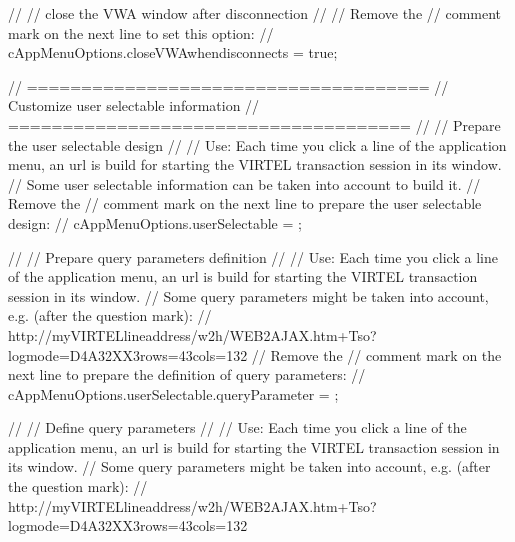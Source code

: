\documentclass[letterpaper,10pt,english]{sphinxmanual}
\begin{document}
\begin{sphinxVerbatim}[commandchars=\\\{\}]
//
// close the VWA window after disconnection
// \PYGZhy{}\PYGZhy{}\PYGZhy{}\PYGZhy{}\PYGZhy{}\PYGZhy{}\PYGZhy{}\PYGZhy{}\PYGZhy{}\PYGZhy{}\PYGZhy{}\PYGZhy{}\PYGZhy{}\PYGZhy{}\PYGZhy{}\PYGZhy{}\PYGZhy{}\PYGZhy{}\PYGZhy{}\PYGZhy{}\PYGZhy{}\PYGZhy{}\PYGZhy{}\PYGZhy{}\PYGZhy{}\PYGZhy{}\PYGZhy{}\PYGZhy{}\PYGZhy{}\PYGZhy{}\PYGZhy{}\PYGZhy{}\PYGZhy{}\PYGZhy{}\PYGZhy{}\PYGZhy{}\PYGZhy{}\PYGZhy{}\PYGZhy{}\PYGZhy{}
// Remove the // comment mark on the next line to set this option:
// cAppMenuOptions.close\PYGZus{}VWA\PYGZus{}when\PYGZus{}disconnects = true;






// =====================================
// Customize user selectable information
// =====================================
//
// Prepare the user selectable design
// \PYGZhy{}\PYGZhy{}\PYGZhy{}\PYGZhy{}\PYGZhy{}\PYGZhy{}\PYGZhy{}\PYGZhy{}\PYGZhy{}\PYGZhy{}\PYGZhy{}\PYGZhy{}\PYGZhy{}\PYGZhy{}\PYGZhy{}\PYGZhy{}\PYGZhy{}\PYGZhy{}\PYGZhy{}\PYGZhy{}\PYGZhy{}\PYGZhy{}\PYGZhy{}\PYGZhy{}\PYGZhy{}\PYGZhy{}\PYGZhy{}\PYGZhy{}\PYGZhy{}\PYGZhy{}\PYGZhy{}\PYGZhy{}\PYGZhy{}\PYGZhy{}
// Use: Each time you click a line of the application menu, an url is build for starting the VIRTEL transaction session in its window.
// Some user selectable information can be taken into account to build it.
// Remove the // comment mark on the next line to prepare the user selectable design:
// cAppMenuOptions.userSelectable = \PYGZob{}\PYGZcb{};

//
// Prepare query parameters definition
// \PYGZhy{}\PYGZhy{}\PYGZhy{}\PYGZhy{}\PYGZhy{}\PYGZhy{}\PYGZhy{}\PYGZhy{}\PYGZhy{}\PYGZhy{}\PYGZhy{}\PYGZhy{}\PYGZhy{}\PYGZhy{}\PYGZhy{}\PYGZhy{}\PYGZhy{}\PYGZhy{}\PYGZhy{}\PYGZhy{}\PYGZhy{}\PYGZhy{}\PYGZhy{}\PYGZhy{}\PYGZhy{}\PYGZhy{}\PYGZhy{}\PYGZhy{}\PYGZhy{}\PYGZhy{}\PYGZhy{}\PYGZhy{}\PYGZhy{}\PYGZhy{}\PYGZhy{}
// Use: Each time you click a line of the application menu, an url is build for starting the VIRTEL transaction session in its window.
// Some query parameters might be taken into account, e.g. (after the question mark):
// http://my\PYGZhy{}VIRTEL\PYGZhy{}line\PYGZhy{}address/w2h/WEB2AJAX.htm+Tso?logmode=D4A32XX3\PYGZam{}rows=43\PYGZam{}cols=132
// Remove the // comment mark on the next line to prepare the definition of query parameters:
// cAppMenuOptions.userSelectable.queryParameter = \PYGZob{}\PYGZcb{};


//
// Define query parameters
// \PYGZhy{}\PYGZhy{}\PYGZhy{}\PYGZhy{}\PYGZhy{}\PYGZhy{}\PYGZhy{}\PYGZhy{}\PYGZhy{}\PYGZhy{}\PYGZhy{}\PYGZhy{}\PYGZhy{}\PYGZhy{}\PYGZhy{}\PYGZhy{}\PYGZhy{}\PYGZhy{}\PYGZhy{}\PYGZhy{}\PYGZhy{}\PYGZhy{}\PYGZhy{}
// Use: Each time you click a line of the application menu, an url is build for starting the VIRTEL transaction session in its window.
// Some query parameters might be taken into account, e.g. (after the question mark):
// http://my\PYGZhy{}VIRTEL\PYGZhy{}line\PYGZhy{}address/w2h/WEB2AJAX.htm+Tso?logmode=D4A32XX3\PYGZam{}rows=43\PYGZam{}cols=132


\end{sphinxVerbatim}
\end{document}
